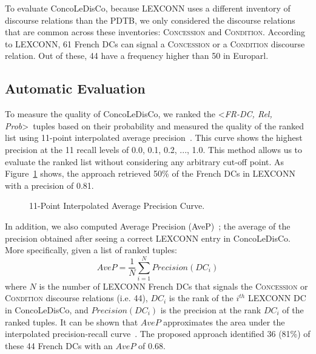 \documentclass[11pt,a4paper]{article}
\def \dict {ConcoLeDisCo}
\begin{document}
To evaluate \dict, because LEXCONN uses a different inventory of discourse relations than the PDTB, we only considered the discourse relations that are common across these inventories: \textsc{Concession} and \textsc{Condition}. According to LEXCONN, 61 French DCs can signal a \textsc{Concession} or a \textsc{Condition} discourse relation. Out of these, 44 have a frequency higher than 50 in Europarl. 

\subsection{Automatic Evaluation}

To measure the quality of \dict, we ranked the \textless \textit{FR-DC, Rel, Prob}\textgreater~tuples based on their probability and measured the quality of the ranked list using 11-point interpolated average precision~\cite{manning08}. 
This curve shows the highest precision at the 11 recall levels of 0.0, 0.1, 0.2, ..., 1.0. 
This method allows us to evaluate the ranked list without considering any arbitrary cut-off point. As Figure~\ref{fig:curve-map-by-definition} shows, the approach retrieved 50\% of the French DCs in LEXCONN with a precision of 0.81.

\begin{figure}[!ht]
    \centering
    \caption{11-Point Interpolated Average Precision Curve.}
    \label{fig:curve-map-by-definition}
\end{figure}

In addition, we also computed Average Precision (AveP)~\cite{manning08}; the average of the precision obtained after seeing a correct LEXCONN entry in \dict. 
More specifically, given a list of ranked tuples:
\begin{equation}
    AveP=\frac{1}{N}\sum_{i=1}^{N}Precision(DC_i)
\end{equation}
where $N$ is the number of LEXCONN French DCs that signals the \textsc{Concession} or \textsc{Condition} discourse relations (i.e. 44), $DC_i$ is the rank of the $i^{th}$ LEXCONN DC in \dict, and $Precision(DC_i)$ is the precision at the rank $DC_i$ of the ranked tuples. 
It can be shown that $AveP$ approximates the area under the interpolated precision-recall curve~\cite{manning08}. 
The proposed approach identified 36 (81\%) of these 44 French DCs with an $AveP$ of 0.68. 
\end{document}
